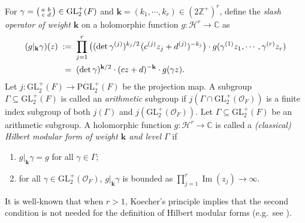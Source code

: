 \documentclass[11pt]{amsart}
\theoremstyle{remark}
\newcommand\sm[1]{\begin{psmallmatrix}#1\end{psmallmatrix}}
\newcommand\mbf[1]{\mathbf{#1}}
\newcommand{\inte}{\mathbb{Z}}
\newcommand{\comp}{\mathbb{C}}
\newcommand{\clh}{\mathcal{H}}
\newcommand{\clo}{\mathcal{O}}
\newcommand{\eq}{\;=\;}
\newcommand{\deq}{\;:=\;}
\def\thin{{\hskip 1pt}}
\newcommand{\GL}{\mathrm{GL}}
\newcommand{\PGL}{\mathrm{PGL}}
\renewcommand{\Im}{\operatorname{Im}}
\begin{document}
For $\gamma=\sm{a&b\\c&d}\in\GL_2^+(F)$ and \mbox{$\mbf{k}=(k_1,\cdots,k_r)\in(2\inte^+)^r$}, define the \textit{slash operator of weight $\mbf{k}$} on a holomorphic function $g:\clh^r\rightarrow\comp$ as
\begin{equation}
\begin{aligned}
\label{slashoperator}
    (g|_\mbf{k}\gamma)(z)&\deq\prod_{j=1}^r\big((\det\gamma^{(j)})^{k_j/2}\thin(c^{(j)}z_j+d^{(j)})^{-k_j}\big)\cdot g(\gamma^{(1)} z_1,\cdots,\gamma^{(r)}z_r) \\
    &\;\eq(\det\gamma)^{\mbf{k}/2}\cdot(cz+d)^{-\mbf{k}}\cdot g(\gamma z).
\end{aligned}
\end{equation}
Let $j:\GL_2^+(F)\rightarrow\PGL_2^+(F)$ be the projection map. A subgroup $\Gamma\subseteq\GL_2^+(F)$ is called an \textit{arithmetic} subgroup if $j(\Gamma\cap\GL_2^+(\clo_F))$ is a finite index subgroup of both $j(\Gamma)$ and $j(\GL_2^+(\clo_F))$. Let $\Gamma\subseteq\GL_2^+(F)$ be an arithmetic subgroup. A holomorphic function $g:\clh^r\rightarrow\comp$ is called a \textit{(classical) Hilbert modular form of weight $\mbf{k}$ and level $\Gamma$} if 
\begin{enumerate}[label=(\arabic*)]
    \item $g|_\mbf{k}\gamma=g$ for all $\gamma\in\Gamma$;
    \item for all $\gamma\in\GL_2^+(\clo_F)$, $g|_\mbf{k}\gamma$ is bounded as $\prod_{j=1}^r\Im(z_j)\rightarrow\infty$.
\end{enumerate}
It is well-known that when $r>1$, Koecher's principle implies that the second condition is not needed for the definition of Hilbert modular forms (e.g.~see \cite[Theorem~1.20]{123}).
\end{document}
